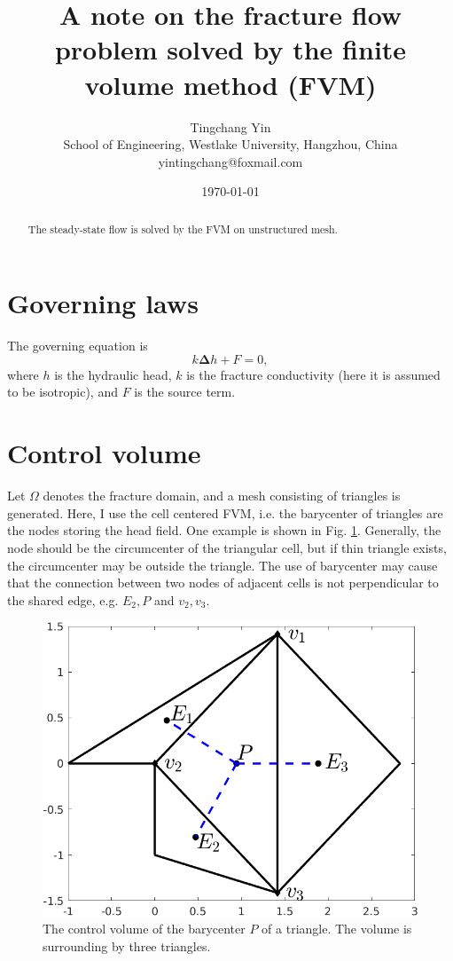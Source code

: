 \documentclass{article}        %
\title{A note on the fracture flow problem solved by the finite volume method (FVM)}
\author         {Tingchang Yin \\School of Engineering, Westlake University, Hangzhou, China\\yintingchang@foxmail.com}
\date{\today}
\begin{document}
\maketitle
\begin{abstract}
	The steady-state flow is solved by the FVM on unstructured mesh.
\end{abstract}
\section{Governing laws}
The governing equation is
\begin{equation}
k\bm{\Delta} h + F = 0, 
\end{equation}
where $h$ is the hydraulic head, $k$ is the fracture conductivity (here it is assumed to be isotropic), and $F$ is the source term.

\section{Control volume}
Let $\Omega$ denotes the fracture domain, and a mesh consisting of triangles is generated. Here, I use the cell centered FVM, i.e. the barycenter of triangles are the nodes storing the head field. One example is shown in Fig. \ref{controlvolume}. Generally, the node should be the circumcenter of the triangular cell, but if thin triangle exists, the circumcenter may be outside the triangle. The use of barycenter may cause that the connection between two nodes of adjacent cells is not perpendicular to the shared edge, e.g. $E_2, P$ and $v_2,v_3$.

\begin{figure}[htb]
	\centering
	\includegraphics[scale=0.4]{figures/self_center_control_volume.png}
	\caption{The control volume of the barycenter $P$ of a triangle. The volume is surrounding by three triangles.}
	\label{controlvolume}
\end{figure} 
\end{document}
